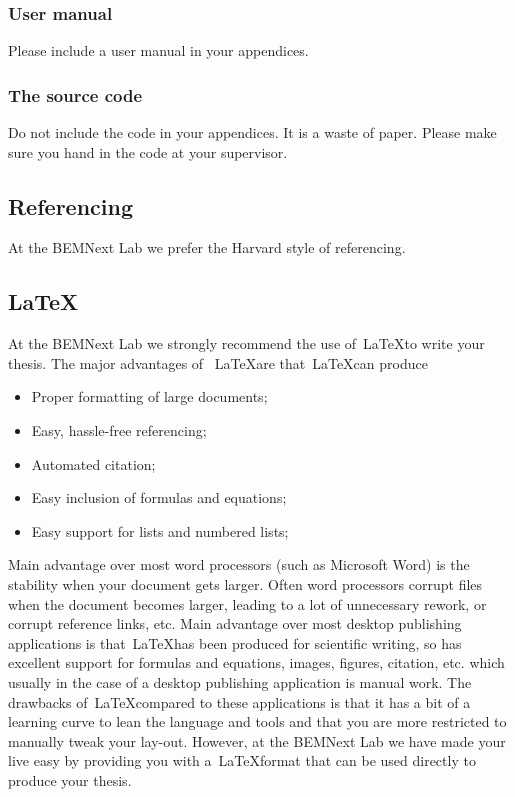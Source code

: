 \documentclass{latex-format/stylesheets/BEMNextstyle}
\begin{document}
\subsubsection*{User manual}
Please include a user manual in your appendices.

\subsubsection*{The source code}
Do not include the code in your appendices. It is a waste of paper. Please make sure you hand in the code at your supervisor.

\subsection*{Referencing}
At the BEMNext Lab we prefer the Harvard style of referencing.

\subsection*{\LaTeX}
At the BEMNext Lab we strongly recommend the use of~\LaTeX to write your thesis. The major advantages of ~\LaTeX are that~\LaTeX can produce 
\begin{itemize}
\item Proper formatting of large documents;
\item Easy, hassle-free referencing;
\item Automated citation;
\item Easy inclusion of formulas and equations;
\item Easy support for lists and numbered lists;
\end{itemize}

Main advantage over most word processors (such as Microsoft Word)  is the stability when your document gets larger. Often word processors corrupt files when the document becomes larger, leading to a lot of unnecessary rework, or corrupt reference links, etc. Main advantage over most desktop publishing applications is that~\LaTeX has been produced for scientific writing, so has excellent support for formulas and equations, images, figures, citation, etc. which usually in the case of a desktop publishing application is manual work.
The drawbacks of~\LaTeX compared to these applications is that it has a bit of a learning curve to lean the language and tools and that you are more restricted to manually tweak your lay-out.
However, at the BEMNext Lab we have made your live easy by providing you with a~\LaTeX format that can be used directly to produce your thesis.
\end{document}
